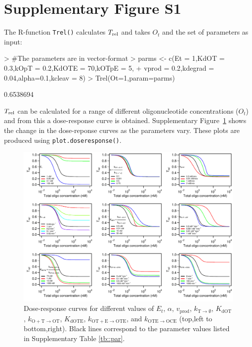 \documentclass[a4paper,11pt]{article}
\newcommand{\kOpT}{k_{\mathrm{O+T \to OT}}}
\newcommand{\kt}{k_{\mathrm{OT+E \to OTE}}}
\newcommand{\kE}{k_{\mathrm{OTE \to OCE}}}
\newcommand{\vp}{v_{\mathrm{prod}}}
\newcommand{\vd}{k_{\mathrm{T \to \emptyset}}}
\newcommand{\Trel}{T_{\rm{rel}}}
\newcommand{\KdOT}{K_{\mathrm{dOT}}}
\newcommand{\KdOTE}{K_{\mathrm{dOTE}}}
\begin{document}
\section{Supplementary Figure S1}
The R-function \texttt{Trel()} calculates $\Trel$ and takes $O_t$ and the set of parameters as input:
\begin{Schunk}
\begin{Sinput}
> #The parameters are in vector-format
> parms <- c(Et = 1,KdOT = 0.3,kOpT = 0.2,KdOTE = 70,kOTpE = 5,	
+            vprod = 0.2,kdegrad = 0.04,alpha=0.1,kcleav = 8)
> Trel(Ot=1,param=parms)
\end{Sinput}
\begin{Soutput}
[1] 0.6538694
\end{Soutput}
\end{Schunk}
$\Trel$ can be calculated for a range of different oligonucleotide concentrations ($O_t$) and from this a dose-response curve is obtained. Supplementary Figure~\ref{fig::Etot} shows the change in the dose-reponse curves as the parameters vary. These plots are produced using \texttt{plot.doseresponse()}.
\begin{figure}[!b]
\includegraphics[width=\textwidth]{SuppFile1-S1.pdf}
\caption{Dose-response curves for different values of $E_{t}$, $\alpha$, $\vp$, $\vd$, $\KdOT$, $\kOpT$, $\KdOTE$, $\kt$, and $\kE$ (top,left to bottom,right). Black lines correspond to the parameter values listed in Supplementary Table \ref{tb::par}.}\label{fig::Etot}
\end{figure}


\end{document}
